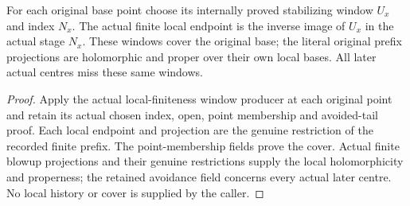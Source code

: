 \begin{lemma}
\label{hir:actual-locally-finite-history-internal-window-atlas}
\leanok
For each original base point choose its internally proved stabilizing window
$U_x$ and index $N_x$. The actual finite local endpoint is the inverse image
of $U_x$ in the actual stage $N_x$. These windows cover the original base;
the literal original prefix projections are holomorphic and proper over
their own local bases. All later actual centres miss these same windows.
\end{lemma}
\begin{proof}
Apply the actual local-finiteness window producer at each original point
and retain its actual chosen index, open, point membership and avoided-tail
proof. Each local endpoint and projection are the genuine restriction of
the recorded finite prefix. The point-membership fields prove the cover.
Actual finite blowup projections and their genuine restrictions supply
the local holomorphicity and properness; the retained avoidance field
concerns every actual later centre. No local history or cover is supplied
by the caller.
\end{proof}

